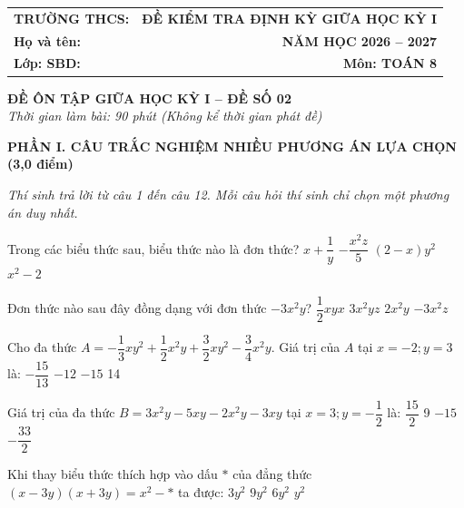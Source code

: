 \documentclass[12pt,a4paper]{article}
\begin{document}
\noindent
\begin{tabularx}{\linewidth}{X r}
\textbf{TRƯỜNG THCS: \dotfill} & \textbf{ĐỀ KIỂM TRA ĐỊNH KỲ GIỮA HỌC KỲ I} \\
\textbf{Họ và tên: \dotfill} & \textbf{NĂM HỌC 2026 -- 2027} \\
\textbf{Lớp: \dotfill \quad SBD: \dotfill} & \textbf{Môn: TOÁN 8} \\
\hline
\end{tabularx}
\vspace{2mm}

\begin{center}
  \textbf{\large ĐỀ ÔN TẬP GIỮA HỌC KỲ I -- ĐỀ SỐ 02}\\
  \textit{Thời gian làm bài: 90 phút (Không kể thời gian phát đề)}
\end{center}
\vspace{1mm}

\noindent\textbf{\large PHẦN I. CÂU TRẮC NGHIỆM NHIỀU PHƯƠNG ÁN LỰA CHỌN (3,0 điểm)}

\textit{Thí sinh trả lời từ câu 1 đến câu 12. Mỗi câu hỏi thí sinh chỉ chọn một phương án duy nhất.}

\vspace{1mm}
\begin{ex}
Trong các biểu thức sau, biểu thức nào là đơn thức?
\choice
{$x + \dfrac{1}{y}$}
{\True $-\dfrac{x^2z}{5}$}
{$(2 - x)y^2$}
{$x^2 - 2$}
\end{ex}

\begin{ex}
Đơn thức nào sau đây đồng dạng với đơn thức $-3x^2y$?
\choice
{$\dfrac{1}{2}xyx$}
{$3x^2yz$}
{\True $2x^2y$}
{$-3x^2z$}
\end{ex}

\begin{ex}
Cho đa thức $A = -\dfrac{1}{3}xy^2 + \dfrac{1}{2}x^2y + \dfrac{3}{2}xy^2 - \dfrac{3}{4}x^2y$. Giá trị của $A$ tại $x = -2; y = 3$ là:
\choice
{$-\dfrac{15}{13}$}
{$-12$}
{\True $-15$}
{14}
\end{ex}

\begin{ex}
Giá trị của đa thức $B = 3x^2y - 5xy - 2x^2y - 3xy$ tại $x = 3; y = -\dfrac{1}{2}$ là:
\choice
{\True $\dfrac{15}{2}$}
{9}
{$-15$}
{$-\dfrac{33}{2}$}
\end{ex}

\begin{ex}
Khi thay biểu thức thích hợp vào dấu $*$ của đẳng thức $(x - 3y)(x + 3y) = x^2 - *$ ta được:
\choice
{$3y^2$}
{\True $9y^2$}
{$6y^2$}
{$y^2$}
\end{ex}
\end{document}
